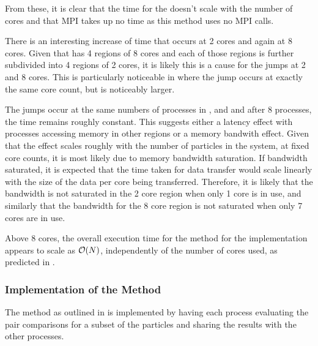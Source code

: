 %
From these, it is clear that
the time for the \individualoperation{} doesn't scale with the number
of cores and that MPI takes up no time as this method uses no MPI calls.

There is an interesting increase of time that occurs at 2 cores and again
at 8 cores.
%
Given that \hector{} has 4 \numa{} regions of 8 cores and each of those
regions is further subdivided into 4 \numa{} regions of 2 cores,
it is likely this is a cause for the jumps at 2 and 8 cores.
%
This is particularly noticeable in
where the jump occurs at exactly the same core count, but is noticeably larger.

The jumps occur at the same numbers of processes in
,
 and
and after 8 processes, the time remains roughly constant.
%
This suggests either a latency effect with processes accessing memory
in other \numa{} regions or a memory bandwith effect.
%
Given that the effect scales roughly with the number of particles
in the system, at fixed core counts, it is most likely due to
memory bandwidth saturation.
%
If bandwidth saturated, it is expected that the time taken for
data transfer would
scale linearly with the size of the data per core being transferred.
%
Therefore, it is likely that the bandwidth is not saturated in
the 2 core \numa{} region
when only 1 core is in use, and
similarly that the bandwidth for
the 8 core \numa{} region is not saturated
when only 7 cores are in use.

Above 8 cores, the overall execution time for
the \individualoperation{} method for the \replicateddata{} implementation
appears to scale as $\mathcal{O}{\left({ N }\right)}$, independently of the number of cores used,
as predicted in
.


%
%

\subsubsection{Implementation of the \pairoperation{} Method}

The \pairoperation{} method as outlined in
is implemented by having each process evaluating the pair
comparisons for a subset of the particles and sharing the
results with the other processes.

